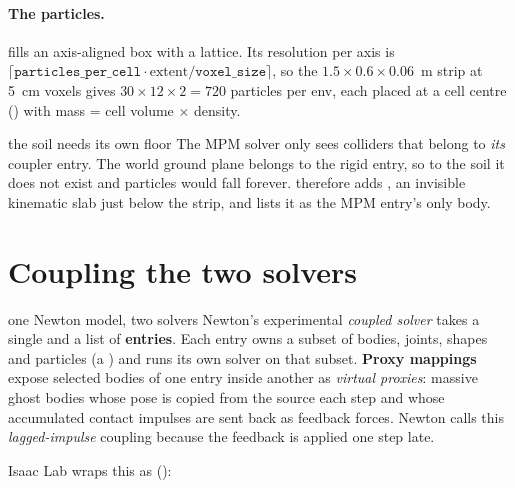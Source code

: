 \paragraph{The particles.}
 fills an axis-aligned box with a lattice. Its resolution
per axis is $\lceil \texttt{particles\_per\_cell}\cdot \text{extent}/\texttt{voxel\_size}\rceil$,
so the $1.5\times0.6\times0.06$~m strip at 5~cm voxels gives $30\times12\times2 = 720$
particles per env, each placed at a cell centre
() with mass = cell volume $\times$
density.

\begin{whybox}{the soil needs its own floor}
The MPM solver only sees colliders that belong to \emph{its} coupler entry.
The world ground plane belongs to the rigid entry, so to the soil it does not
exist and particles would fall forever.  therefore
adds , an invisible kinematic slab just below the strip, and
lists it as the MPM entry's only body.
\end{whybox}

\section{Coupling the two solvers}
\label{sec:coupling}

\begin{newtonbox}{one Newton model, two solvers}
Newton's experimental \emph{coupled solver} takes a single  and a
list of \textbf{entries}. Each entry owns a subset of bodies, joints, shapes
and particles (a ) and runs its own solver on that subset.
\textbf{Proxy mappings} expose selected bodies of one entry inside another
as \emph{virtual proxies}: massive ghost bodies whose pose is copied from the
source each step and whose accumulated contact impulses are sent back as
feedback forces. Newton calls this \emph{lagged-impulse} coupling because the
feedback is applied one step late.
\end{newtonbox}

Isaac Lab wraps this as 
():

